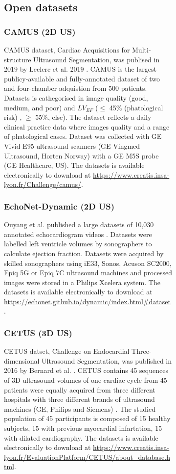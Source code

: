 \begin{figure}[H]
\begin{figure}[H]
\subsection{Open datasets}
\subsubsection{CAMUS (2D US)}
CAMUS dataset, Cardiac Acquisitions for Multi-structure Ultrasound Segmentation, was publised in 2019 by Leclerc et al. 2019 \cite{leclerc2019-IEEETransMedicalImaging}.
CAMUS is the largest publicy-available and fully-annotated dataset of two and four-chamber adquistion from 500 patients.
Datasets is cathegorised in image quality (good, medium, and poor) and $LV_{EF}$ ($\leq$ 45\% (phatological risk) , $\geq$ 55\%, else).
The dataset reflects a daily clinical practice data where images quality and a range of phatological cases.
Dataset was collected with GE Vivid E95 ultrasound scanners (GE Vingmed Ultrasound, Horten Norway) with a GE M5S probe (GE Healthcare, US).
The datasets is available electronically to download at \url{https://www.creatis.insa-lyon.fr/Challenge/camus/}.

\subsubsection{EchoNet-Dynamic (2D US)}
Ouyang et al. published a large datasets of 10,030 annotated echocardiogram videos \cite{ouyang-NeuripsML4H2019, Ouyang-Nature-APR2020}.
Datasets were labelled left ventricle volumes by sonographers to calculate ejection fraction.
Datasets were acquired by skilled sonographers using iE33, Sonos, Acuson SC2000, Epiq 5G or Epiq 7C ultrasound machines and processed images were stored in a Philips Xcelera system.
The datasets is available electronically to download at \url{https://echonet.github.io/dynamic/index.html#dataset}.

\subsubsection{CETUS (3D US)}
CETUS datset, Challenge on Endocardial Three-dimensional Ultrasound Segmentation, was published in 2016 by Bernard et al. \cite{bernard2016TMI}.
CETUS contains 45 sequences of 3D ultrasound volumes of one cardiac cycle from 45 patients were equally acquired from three different hospitals with three different brands of ultrasound machines (GE, Philips and Siemens) \cite{bernard2016TMI}.
The studied population of 45 participants is composed of 15 healthy subjects, 15 with previous myocardial infartation, 15 with dilated cardiography.
The datasets is available electronically to download at \url{https://www.creatis.insa-lyon.fr/EvaluationPlatform/CETUS/about_database.html}.


\end{figure}
\end{figure}
